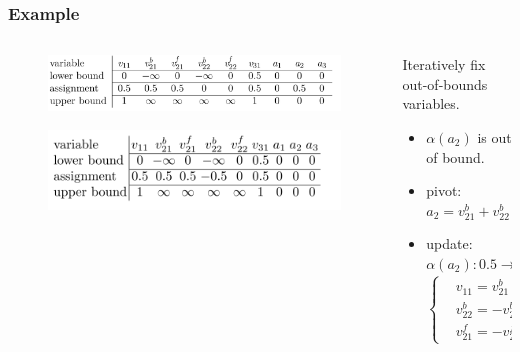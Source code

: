 \documentclass[aspectratio=169%
,serif,mathserif]{beamer}
\begin{document}
\begin{frame}
	\frametitle{Example}
	\begin{columns}
		\begin{column}{.5\textwidth}
			\begin{figure}[htbp]
				\includegraphics[width=1\linewidth]{10.png}
			\end{figure}
			\begin{figure}[htbp]
				\includegraphics[width=1\linewidth]{11.png}
			\end{figure}
		\end{column}

		\begin{column}{.5\textwidth}
				Iteratively fix out-of-bounds variables.
			\begin{itemize}
				\item $\alpha(a_{2})$ is out of bound.
				\item pivot: $a_{2}=v_{21}^{b}+v_{22}^{b}-a_{1} \to v_{22}^{b}=-v_{21}^{b}+a_{1}+a_{2}$ 
				\item update: $\alpha(a_{2}):0.5 \to 0,\alpha(v_{22}^{b}):0 \to -0.5$
				\begin{equation}
					\left\{
						\begin{array}{lll}
						& v_{11}=v_{21}^{b}-a_{1}\\
						& v_{22}^{b}=-v_{21}^{b}+a_{1}+a_{2}\\
						& v_{21}^{f}=-v_{22}^{f}+v_{31}-a_{3}
					\end{array} \right.
				\end{equation}
			\end{itemize}
		\end{column}
	\end{columns}
\end{frame}
\end{document}

